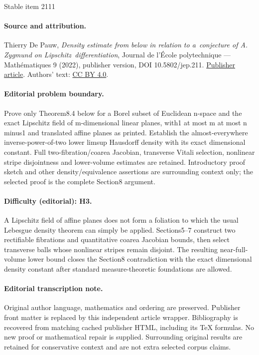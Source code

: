 \documentclass[11pt]{article}
\theoremstyle{definition}
\theoremstyle{jepanonymous}
\theoremstyle{plain}
\begin{document}
\begin{center}{\Large Stable item 2111}\end{center}
\paragraph{Source and attribution.}
Thierry De Pauw, \emph{Density estimate from below in relation to a conjecture of A. Zygmund on Lipschitz differentiation}, Journal de l’École polytechnique — Mathématiques 9 (2022), publisher version, DOI 10.5802/jep.211. \href{https://jep.centre-mersenne.org/articles/10.5802/jep.211/}{Publisher article}. Authors' text: \href{https://creativecommons.org/licenses/by/4.0/}{CC BY 4.0}.
\paragraph{Editorial problem boundary.}
Prove only Theorem8.4 below for a Borel subset of Euclidean n-space and the exact Lipschitz field of m-dimensional linear planes, with1 at most m at most n minus1 and translated affine planes as printed. Establish the almost-everywhere inverse-power-of-two lower limsup Hausdorff density with its exact dimensional constant. Full two-fibration/coarea Jacobian, transverse Vitali selection, nonlinear stripe disjointness and lower-volume estimates are retained. Introductory proof sketch and other density/equivalence assertions are surrounding context only; the selected proof is the complete Section8 argument.
\paragraph{Difficulty (editorial): H3.}
A Lipschitz field of affine planes does not form a foliation to which the usual Lebesgue density theorem can simply be applied. Sections5–7 construct two rectifiable fibrations and quantitative coarea Jacobian bounds, then select transverse balls whose nonlinear stripes remain disjoint. The resulting near-full-volume lower bound closes the Section8 contradiction with the exact dimensional density constant after standard measure-theoretic foundations are allowed.
\paragraph{Editorial transcription note.}
Original author language, mathematics and ordering are preserved. Publisher front matter is replaced by this independent article wrapper. Bibliography is recovered from matching cached publisher HTML, including its TeX formulas. No new proof or mathematical repair is supplied. Surrounding original results are retained for conservative context and are not extra selected corpus claims.
\clearpage
\end{document}
